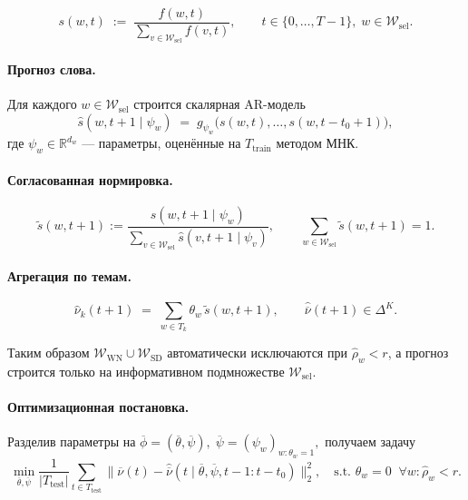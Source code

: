 \documentclass[14pt,a4paper]{article}
\begin{document}
\[
  s(w,t)\;:=\;
  \frac{f(w,t)}
       {\displaystyle\sum_{v\in\mathcal{W}_{\mathrm{sel}}}f(v,t)},
  \qquad
  t\in\{0,\dots,T{-}1\},\; w\in\mathcal{W}_{\mathrm{sel}}.
\]

\paragraph{Прогноз слова.}
Для каждого $w\in\mathcal{W}_{\mathrm{sel}}$ строится скалярная AR-модель
\[
  \widehat s\!\left(w,t+1\mid\psi_{w}\right)
  \;=\;
  g_{\psi_{w}}\!\bigl(s(w,t),\dots,s(w,t-t_0+1)\bigr),
\]
где $\psi_{w}\in\mathbb R^{d_w}$ — параметры, оценённые на $T_{\mathrm{train}}$ методом МНК.

\paragraph{Согласованная нормировка.}
\[
  \widetilde s(w,t+1)
  :=
  \frac{\widehat{s}(w,t+1\mid\psi_{w})}
       {\displaystyle\sum_{v\in\mathcal{W}_{\mathrm{sel}}}
        \widehat{s}(v,t+1\mid\psi_{v})},
  \qquad
  \sum_{w\in\mathcal{W}_{\mathrm{sel}}}\widetilde s(w,t+1)=1.
\]


\paragraph{Агрегация по темам.}
\[
  \widehat{\nu}_k(t+1)
  \;=\;
  \sum_{w\in T_k}\theta_{w}\,\widetilde s(w,t+1),
  \qquad
  \widehat{\overline{\nu}}(t+1)\in\Delta^{K}.
\]

Таким образом
$\mathcal{W}_{\mathrm{WN}}\cup\mathcal{W}_{\mathrm{SD}}$  
автоматически исключаются при $\widehat\rho_{w}<r$,  
а прогноз строится только на информативном подмножестве
$\mathcal{W}_{\mathrm{sel}}$.

\paragraph{Оптимизационная постановка.}
Разделив параметры на  
\(
  \overline{\phi}=(\overline{\theta},\overline{\psi}),
\;
  \overline{\psi}=(\psi_{w})_{w:\theta_{w}=1},
\)
получаем задачу
\[
  \min_{\overline{\theta},\overline{\psi}}
  \frac{1}{|T_{\mathrm{test}}|}
  \sum_{t\in T_{\mathrm{test}}}
  \bigl\|
    \overline{\nu}(t)-\widehat{\overline{\nu}}(t\mid
    \overline{\theta},\overline{\psi},t-1{:}t-t_0)
  \bigr\|_2^{2},
  \quad
  \text{s.t. } \theta_{w}=0\;\;\forall w:\widehat\rho_{w}<r.
\]
\end{document}
